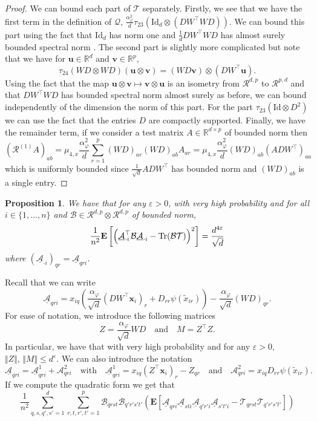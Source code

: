 \documentclass[letterpaper, 10pt, dvipsnames]{article}
\numberwithin{equation}{section}
\newcommand{\A}{\mathcal{A}}
\newcommand{\Au}{\underline{\mathcal{A}}}
\newcommand{\B}{\mathcal{B}}
\newcommand{\Q}{\mathcal{Q}}
\newcommand{\R}{\mathcal{R}}
\newcommand{\T}{\mathcal{T}}
\renewcommand{\u}{\mathbf{u}}
\renewcommand{\v}{\mathbf{v}}
\newcommand{\x}{\mathbf{x}}
\renewcommand{\phi}{\varphi}
\newcommand{\wt}{\widetilde}
\let\O\relax
\newcommand{\O}[1]{\mathcal{O}\left(#1\right)}
\newcommand{\Eb}{\mathbf{E}}
\newtheorem{prop}[ccounter]{Proposition}
\theoremstyle{definition}
\begin{document}
\begin{proof}
  We can bound each part of $\T$ separately. Firstly, we see that we have the first term in the definition of $\Q$, 
  \(
  \frac{\alpha_\phi^2}{d}\tau_{23}\left(
    \mathrm{Id}_d \otimes \left(
      DW^\top WD
    \right)
  \right).
  \)
  We can bound this part using the fact that $\mathrm{Id}_d$ has norm one and $\frac{1}{d}DW^\top WD$ has almost surely bounded spectral norm \cites{silverstein1995analysis, bai1998no}. The second part is slightly more complicated but note that we have for $\u\in\mathbb{R}^d$ and $\v\in\mathbb{R}^p$, 
  \[
  \tau_{24}\left(
    WD\otimes WD
  \right)(\u\otimes \v)
  =
  \left(
    WD\v
  \right)
  \otimes 
  \left(
    DW^\top \u
  \right).
  \]
  Using the fact that the map $\u\otimes \v \mapsto \v\otimes \u$ is an isometry from $\R^{d,p}$ to $\R^{p,d}$ and that $DW^\top WD$ has bounded spectral norm almost surely as before, we can bound independently of the dimension the norm of this part. For the part $\tau_{23}\left(\mathrm{Id}\otimes D^2\right)$ we can use the fact that the entries $D$ are compactly supported. Finally, we have the remainder term, if we consider a test matrix $A\in\mathbb{R}^{d\times p}$ of bounded norm then 
  \[
  (\R^{(1)}A)_{ab} = 
  \mu_{4,x}\frac{\alpha_\phi^2}{d}
  \sum_{r=1}^p
  (WD)_{ar}(WD)_{ab}A_{ar}
  =
  \mu_{4,x}\frac{\alpha_\phi^2}{d}
  (WD)_{ab}\left(ADW^\top\right)_{aa}
  \]
  which is uniformly bounded since $\frac{1}{\sqrt{d}}ADW^\top$ has bounded norm and $(WD)_{ab}$ is a single entry. 
\end{proof}
\begin{prop}\label{prop:baizhouquadratic}
  We have that for any $\varepsilon>0$, with very high probability and for all $i\in \{1,\dots,n\}$ and $\B\in \R^{d,p}\otimes \R^{d,p}$ of bounded norm, 
  \[
    \frac{1}{n^2}\Eb\left[
      \left(
        \Au_{\cdot i}^\top \B\Au_{\cdot i} - \mathrm{Tr}(\B\T)
      \right)^2
    \right]  
    =
    \O{\frac{d^{4\varepsilon}}{\sqrt{d}}}
  \] 
  where $(\Au_{\cdot i})_{qr} = \Au_{qri}$.
\end{prop}
Recall that we can write 
\[
\Au_{qri} = x_{iq}\left(
  \frac{\alpha_\phi}{\sqrt{d}}(DW^\top \x_i)_r + D_{rr}\psi(\wt{x}_{ir})
\right)
-
\frac{\alpha_\phi}{\sqrt{d}}(WD)_{qr}.
\]
For ease of notation, we introduce the following matrices 
\[
Z = \frac{\alpha_\phi}{\sqrt{d}}WD\quad\text{and}\quad M = Z^\top Z.
\]
In particular, we have that with very high probability and for any $\varepsilon>0$, $\Vert Z\Vert,\,\Vert M\Vert \leqslant d^\varepsilon$. We can also introduce the notation 
\[
\Au_{qri} = \Au^1_{qri}+\A^2_{qri}
\quad\text{with}\quad 
\Au^1_{qri}=x_{iq}(Z^\top\x_i)_r-Z_{qr} \quad\text{and}\quad 
\A^2_{qri} = x_{iq}D_{rr}\psi(\wt{x}_{ir}).
\]
If we compute the quadratic form we get that 
\[
\frac{1}{n^2}\sum_{q,s,q',s'=1}^d\sum_{r,t,r',t'=1}^p 
\B_{qrst}\B_{q'r's't'}
\left(
  \Eb\left[
    \Au_{qri}\Au_{sti}\Au_{q'r'i}\Au_{s't'i}-\T_{qrst}\T_{q'r's't'}
  \right]
\right)
\]
\end{document}
